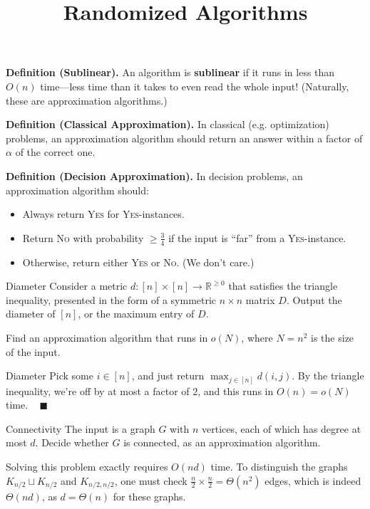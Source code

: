\title{Randomized Algorithms}



\textbf{Definition (Sublinear).} An algorithm is \textbf{sublinear} if it runs in less than $O(n)$ time---less time than it takes to even read the whole input!  (Naturally, these are approximation algorithms.)

\textbf{Definition (Classical Approximation).} In classical (e.g. optimization) problems, an approximation algorithm should return an answer within a factor of $\alpha$ of the correct one.

\textbf{Definition (Decision Approximation).} In decision problems, an approximation algorithm should:
\begin{itemize}
    \item Always return \textsc{Yes} for \textsc{Yes}-instances.
    \item Return \textsc{No} with probability $\geq \frac{3}{4}$ if the input is ``far'' from a \textsc{Yes}-instance.
    \item Otherwise, return either \textsc{Yes} or \textsc{No}.  (We don't care.)
\end{itemize}

\begin{problem}{Diameter}
    Consider a metric $d: [n] \times [n] \to \mathbb{R}^{\geq 0}$ that satisfies the triangle inequality, presented in the form of a symmetric $n \times n$ matrix $D$.  Output the diameter of $[n]$, or the maximum entry of $D$.

    Find an approximation algorithm that runs in $o(N)$, where $N = n^2$ is the size of the input.
\end{problem}

\begin{solution}{Diameter}
    Pick some $i \in [n]$, and just return $\max_{j \in [n]} d(i, j)$.  By the triangle inequality, we're off by at most a factor of $2$, and this runs in $O(n) = o(N)$ time. ~ $\blacksquare$
\end{solution}

\begin{problem}{Connectivity}
    The input is a graph $G$ with $n$ vertices, each of which has degree at most $d$.  Decide whether $G$ is connected, as an approximation algorithm.
\end{problem}

\begin{remark}
    Solving this problem exactly requires $O(nd)$ time.  To distinguish the graphs $K_{n/2} \sqcup K_{n/2}$ and $K_{n/2, n/2}$, one must check $\frac{n}{2} \times \frac{n}{2} = \Theta(n^2)$ edges, which is indeed $\Theta(nd)$, as $d = \Theta(n)$ for these graphs.
\end{remark}

